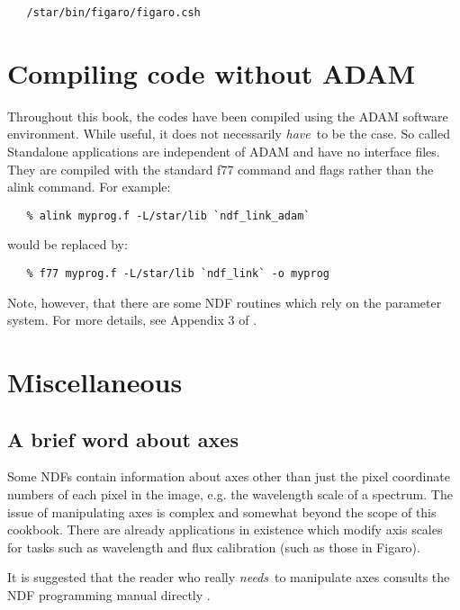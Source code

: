 \begin{verbatim}
   /star/bin/figaro/figaro.csh
\end{verbatim}
 
\section{Compiling code without ADAM}

Throughout this book, the codes have been compiled using the ADAM software
environment. While useful, it does not necessarily {\em have}\, to be the
case. So called Standalone applications are independent of ADAM and have
no interface files. They are compiled with the standard {\sf f77} command
and flags rather than the {\sf alink} command. For example: 

\begin{verbatim}
   % alink myprog.f -L/star/lib `ndf_link_adam`
\end{verbatim}

would be replaced by:

\begin{verbatim}
   % f77 myprog.f -L/star/lib `ndf_link` -o myprog
\end{verbatim}

Note, however, that there are some NDF routines which rely on the parameter 
system. For more details, see Appendix 3 of .

\section{Miscellaneous}

\subsection{A brief word about axes}

Some NDFs contain information about axes other than just the pixel
coordinate numbers of each pixel in the image, e.g. the wavelength scale
of a spectrum. The issue of manipulating axes is complex and somewhat
beyond the scope of this cookbook. There are already applications in
existence which modify axis scales for tasks such as wavelength and flux
calibration (such as those in Figaro). 

It is suggested that the reader who really {\em needs}\, to manipulate axes 
consults the NDF programming manual directly .

